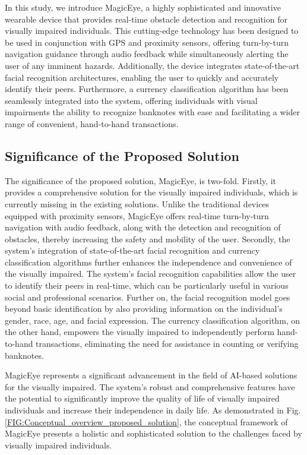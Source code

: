 \documentclass[journal,12pt,onecolumn,letterpaper]{IEEEtran}
\begin{document}
In this study, we introduce MagicEye, a highly sophisticated and innovative wearable device that provides real-time obstacle detection and recognition for visually impaired individuals. This cutting-edge technology has been designed to be used in conjunction with GPS and proximity sensors, offering turn-by-turn navigation guidance through audio feedback while simultaneously alerting the user of any imminent hazards. Additionally, the device integrates state-of-the-art facial recognition architectures, enabling the user to quickly and accurately identify their peers. Furthermore, a currency classification algorithm has been seamlessly integrated into the system, offering individuals with visual impairments the ability to recognize banknotes with ease and facilitating a wider range of convenient, hand-to-hand transactions. 

\subsection{Significance of the Proposed Solution}

The significance of the proposed solution, MagicEye, is two-fold. Firstly, it provides a comprehensive solution for the visually impaired individuals, which is currently missing in the existing solutions. Unlike the traditional devices equipped with proximity sensors, MagicEye offers real-time turn-by-turn navigation with audio feedback, along with the detection and recognition of obstacles, thereby increasing the safety and mobility of the user. Secondly, the system's integration of state-of-the-art facial recognition and currency classification algorithms further enhances the independence and convenience of the visually impaired. The system's facial recognition capabilities allow the user to identify their peers in real-time, which can be particularly useful in various social and professional scenarios. Further on, the facial recognition model goes beyond basic identification by also providing information on the individual's gender, race, age, and facial expression. The currency classification algorithm, on the other hand, empowers the visually impaired to independently perform hand-to-hand transactions, eliminating the need for assistance in counting or verifying banknotes. 

MagicEye represents a significant advancement in the field of AI-based solutions for the visually impaired. The system's robust and comprehensive features have the potential to significantly improve the quality of life of visually impaired individuals and increase their independence in daily life. As demonstrated in Fig. \ref{FIG:Conceptual_overview_proposed_solution}, the conceptual framework of MagicEye presents a holistic and sophisticated solution to the challenges faced by visually impaired individuals.
\end{document}
